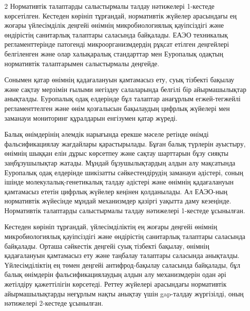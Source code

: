 \begin{multicols}{2}
Нормативтік талаптарды салыстырмалы талдау нәтижелері 1-кестеде
көрсетілген. Кестеден көрініп тұрғандай, нормативтік жүйелер арасындағы
ең жоғары үйлесімділік деңгейі өнімнің микробиологиялық қауіпсіздігі
және өндірістің санитарлық талаптары саласында байқалады. ЕАЭО
техникалық регламенттерінде патогенді микроорганизмдердің рұқсат етілген
деңгейлері белгіленген және олар халықаралық стандарттар мен Еуропалық
одақтың нормативтік талаптарымен салыстырмалы деңгейде.

Сонымен қатар өнімнің қадағалануын қамтамасыз ету, суық тізбекті бақылау
және сақтау мерзімін ғылыми негіздеу салаларында белгілі бір
айырмашылықтар анықталды. Еуропалық одақ елдерінде бұл талаптар
анағұрлым егжей-тегжейлі регламенттелген және өнім қозғалысын бақылаудың
цифрлық жүйелері мен заманауи мониторинг құралдарын енгізумен қатар
жүреді.

Балық өнімдерінің әлемдік нарығында ерекше мәселе ретінде өнімді
фальсификациялау жағдайлары қарастырылады. Бұған балық түрлерін
ауыстыру, өнімнің шыққан елін дұрыс көрсетпеу және сақтау шарттарын бұзу
сияқты заңбұзушылықтар жатады. Мұндай бұзушылықтардың алдын алу
мақсатында Еуропалық одақ елдерінде шикізатты сәйкестендірудің заманауи
әдістері, соның ішінде молекулалық-генетикалық талдау әдістері және
өнімнің қадағалануын қамтамасыз ететін цифрлық жүйелер кеңінен
қолданылады. Ал ЕАЭО-ның нормативтік жүйесінде мұндай механизмдер
қазіргі уақытта даму кезеңінде. Нормативтік талаптарды салыстырмалы
талдау нәтижелері 1-кестеде ұсынылған.

Кестеден көрініп тұрғандай, үйлесімділіктің ең жоғары деңгейі өнімнің
микробиологиялық қауіпсіздігі және өндірістің санитарлық талаптары
саласында байқалады. Орташа сәйкестік деңгейі суық тізбекті бақылау,
өнімнің қадағалануын қамтамасыз ету және таңбалау талаптары саласында
анықталды. Үйлесімділіктің ең төмен деңгейі антифрод-бақылау саласында
байқалады, бұл балық өнімдерін фальсификациялаудың алдын алу
механизмдерін одан әрі жетілдіру қажеттілігін көрсетеді. Реттеу жүйелері
арасындағы нормативтік айырмашылықтарды неғұрлым нақты анықтау үшін
gap-талдау жүргізілді, оның нәтижелері 2-кестеде ұсынылған.
\end{multicols}
\vspace{-2em}
